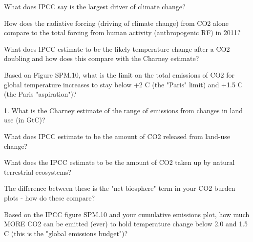 \documentclass[11pt]{book}
\begin{document}
\bee
\item What does IPCC say is the largest driver of climate change?
\item How does the radiative forcing (driving of climate change) from CO2 alone compare to the total forcing from human activity (anthropogenic RF) in 2011?
\item What does IPCC estimate to be the likely temperature change after a CO2 doubling and how does this compare with the Charney estimate?
\item Based on Figure SPM.10, what is the limit on the total emissions of CO2 for global temperature increases to stay below +2 C (the "Paris" limit) and +1.5 C (the Paris "aspiration")?
\eee


\bee
\item 1. What is the Charney estimate of the range of emissions from changes in land use (in GtC)?

\item What does IPCC estimate to be the amount of CO2 released from land-use change?

\item What does the IPCC estimate to be the amount of CO2 taken up by natural terrestrial ecosystems?

\item The difference between these is the "net biosphere" term in your CO2 burden plots - how do these compare?

\item Based on the IPCC figure SPM.10 and your cumulative emissions plot, how much MORE CO2 can be emitted (ever) to hold temperature change below 2.0 and 1.5 C (this is the "global emissions budget")?

\eee
\end{document}
